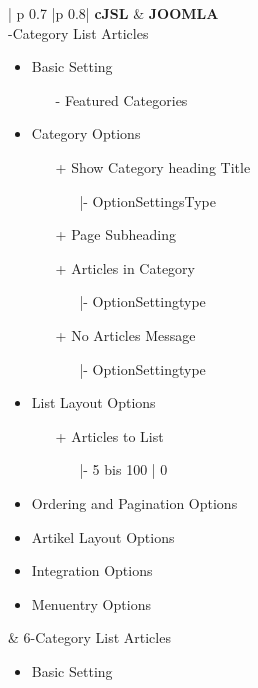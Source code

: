 \begin{minipage}{0.7\textwidth}
\begin{longtable}{| p {0.7\textwidth} |p {0.8\textwidth}|}
\hline
\textbf{cJSL} 
&  
\textbf{JOOMLA} \\ -Category List Articles
\begin{itemize}
\item Basic Setting
	\begin{enumerate}
			\item[-] Featured Categories
	 \end{enumerate}
\item Category Options
	\begin{enumerate}
		\item[+]Show Category heading Title  
			\begin{enumerate}
			\item[|-] OptionSettingsType
			\end{enumerate}
		\item[+] Page Subheading
		\item[+] Articles in Category
	   		\begin{enumerate}
	   			\item[|-] OptionSettingtype
	   		\end{enumerate}
	   	\item[+] No Articles Message
	   		\begin{enumerate}
	   			\item[|-] OptionSettingtype
	   		\end{enumerate}  
	\end{enumerate}
\item List Layout Options
\begin{enumerate}
   	   	\item[+] Articles to List
   	   	\begin{enumerate}
   	   				\item[|-] 5 bis 100 | 0
   	   			\end{enumerate}
   	   	\end{enumerate}
\item Ordering and Pagination Options
\item Artikel Layout Options
\item Integration Options
\item Menuentry Options
\end{itemize}
&
6-Category List Articles
\begin{itemize}
\item Basic Setting

\end{itemize}
\end{longtable}
\end{minipage}
